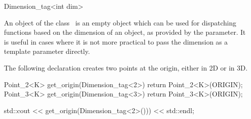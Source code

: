 \begin{ccRefClass} {Dimension_tag<int dim>}

\ccDefinition
An object of the class \ccRefName\ is an empty object which can be used
for dispatching functions based on the dimension of an object, as provided
by the  parameter.  It is useful in cases where it is not more
practical to pass the dimension as a template parameter directly.


\ccConstants


\ccCreation
{}

\ccExample

The following declaration creates two points at the origin, either in 2D or in 3D.

\begin{cprog}
  Point_2<K> get_origin(Dimension_tag<2>) { return Point_2<K>(ORIGIN); }
  Point_3<K> get_origin(Dimension_tag<3>) { return Point_3<K>(ORIGIN); }

  std::cout << get_origin(Dimension_tag<2>())) << std::endl;
\end{cprog} 

\ccSeeAlso
{}

\end{ccRefClass} 
